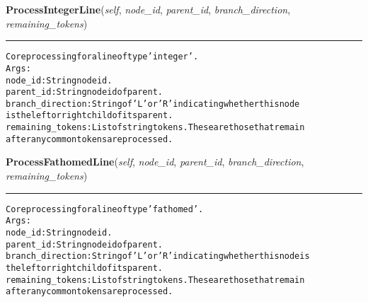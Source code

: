     \vspace{0.5ex}

\hspace{.8\funcindent}\begin{boxedminipage}{\funcwidth}

    \raggedright \textbf{ProcessIntegerLine}(\textit{self}, \textit{node\_id}, \textit{parent\_id}, \textit{branch\_direction}, \textit{remaining\_tokens})

    \vspace{-1.5ex}

    \rule{\textwidth}{0.5\fboxrule}
\setlength{\parskip}{2ex}
\begin{alltt}

Core processing for a line of type 'integer'.
Args:
  node\_id: String node id.
  parent\_id: String node id of parent.
  branch\_direction: String of 'L' or 'R' indicating whether this node
  is the left or right child of its parent.
  remaining\_tokens: List of string tokens. These are those that remain
    after any common tokens are processed.
\end{alltt}

\setlength{\parskip}{1ex}
    \end{boxedminipage}

    \label{coinor:grumpy:BB:BBTree:ProcessFathomedLine}

    \vspace{0.5ex}

\hspace{.8\funcindent}\begin{boxedminipage}{\funcwidth}

    \raggedright \textbf{ProcessFathomedLine}(\textit{self}, \textit{node\_id}, \textit{parent\_id}, \textit{branch\_direction}, \textit{remaining\_tokens})

    \vspace{-1.5ex}

    \rule{\textwidth}{0.5\fboxrule}
\setlength{\parskip}{2ex}
\begin{alltt}

Core processing for a line of type 'fathomed'.
Args:
  node\_id: String node id.
  parent\_id: String node id of parent.
  branch\_direction: String of 'L' or 'R' indicating whether this node is
    the left or right child of its parent.
  remaining\_tokens: List of string tokens. These are those that remain
    after any common tokens are processed.
\end{alltt}

\setlength{\parskip}{1ex}
    \end{boxedminipage}

